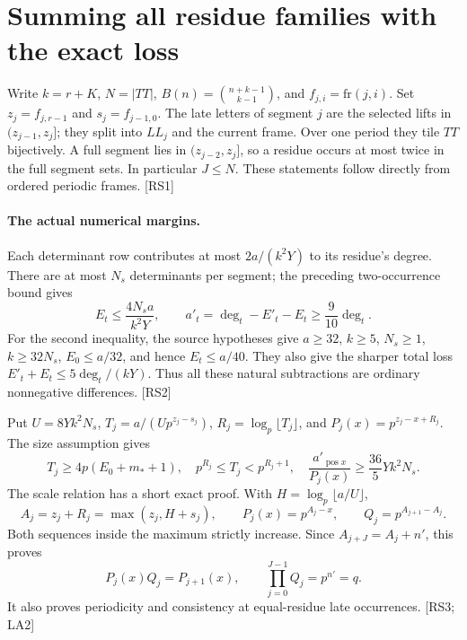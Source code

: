\section{Summing all residue families with the exact loss}\label{sec:residue-summation}


Write $k=r+K$, $N=|TT|$, $B(n)=\binom{n+k-1}{k-1}$, and
$f_{j,i}=\mathrm{fr}(j,i)$. Set $z_j=f_{j,r-1}$ and $s_j=f_{j-1,0}$.
The late letters of segment $j$ are the selected lifts in $(z_{j-1},z_j]$;
they split into $LL_j$ and the current frame. Over one period they tile
$TT$ bijectively. A full segment lies in $(z_{j-2},z_j]$, so a residue
occurs at most twice in the full segment sets. In particular $J\le N$.
These statements follow directly from ordered periodic frames. \textsf{[RS1]}

\paragraph{The actual numerical margins.}
Each determinant row contributes at most $2a/(k^2Y)$ to its residue's
degree. There are at most $N_s$ determinants per segment; the preceding
two-occurrence bound gives
\[
 E_t\le\frac{4N_sa}{k^2Y},\qquad
 a'_t=\deg_t-E'_t-E_t\ge\frac9{10}\deg_t.
 \tag{RS.1}
\]
For the second inequality, the source hypotheses give
$a\ge32$, $k\ge5$, $N_s\ge1$, $k\ge32N_s$, $E_0\le a/32$,
and hence $E_t\le a/40$. They also give the sharper total loss
$E'_t+E_t\le5\deg_t/(kY)$. Thus all these natural subtractions are
ordinary nonnegative differences. \textsf{[RS2]}

Put $U=8Yk^2N_s$, $T_j=a/(Up^{z_j-s_j})$,
$R_j=\log_p\lfloor T_j\rfloor$, and $P_j(x)=p^{z_j-x+R_j}$.
The size assumption gives
\[
 T_j\ge4p(E_0+m_*+1),\quad
 p^{R_j}\le T_j<p^{R_j+1},\quad
 \frac{a'_{\operatorname{pos}x}}{P_j(x)}
 \ge\frac{36}{5}Yk^2N_s. \tag{RS.2}
\]
The scale relation has a short exact proof. With
$H=\log_p\lfloor a/U\rfloor$,
\[
 A_j=z_j+R_j=\max(z_j,H+s_j),\qquad
 P_j(x)=p^{A_j-x},\qquad Q_j=p^{A_{j+1}-A_j}.
\]
Both sequences inside the maximum strictly increase. Since
$A_{j+J}=A_j+n'$, this proves
\[
 P_j(x)Q_j=P_{j+1}(x),\qquad \prod_{j=0}^{J-1}Q_j=p^{n'}=q.
 \tag{RS.3}
\]
It also proves periodicity and consistency at equal-residue late
occurrences. \textsf{[RS3; LA2]}

